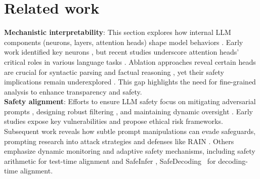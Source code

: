 \section{Related work}
\textbf{Mechanistic interpretability}: This section explores how internal LLM components (neurons, layers, attention heads) shape model behaviors \cite{geiger2021causal, stolfo2023a, gurnee2023finding}. Early work identified key neurons \cite{zou2023transparency, chen2024findingsafetyneuronslarge}, but recent studies underscore attention heads’ critical roles in various language tasks \cite{vig2019multiscalevisualizationattentiontransformer, wu2025retrieval}. Ablation approaches reveal certain heads are crucial for syntactic parsing and factual reasoning \cite{NEURIPS2019_2c601ad9, meng2023locatingeditingfactualassociations}, yet their safety implications remain underexplored \cite{gould2023successorheadsrecurringinterpretable, wang2023interpretability}. This gap highlights the need for fine-grained analysis to enhance transparency and safety.\\
\textbf{Safety alignment}: Efforts to ensure LLM safety focus on mitigating adversarial prompts \cite{xie2018mitigating}, designing robust filtering \cite{xiao2024ritfisrobustinputtesting}, and maintaining dynamic oversight \cite{kenton2024scalableoversightweakllms, wang-etal-2024-languages}. Early studies \cite{YAO2024100211} expose key vulnerabilities and propose ethical risk frameworks. Subsequent work \cite{sachdeva2025turninglogicprobing, banerjee2024unethicalinstructioncentricresponsesllms} reveals how subtle prompt manipulations can evade safeguards, prompting research into attack strategies \cite{10.5555/3692070.3694246} and defenses like RAIN \cite{li2023rainlanguagemodelsalign}. Others emphasize dynamic monitoring \cite{bhardwaj2024languagemodelshomersimpson} and adaptive safety mechanisms, including safety arithmetic \cite{hazra2024safetyarithmeticframeworktesttime} for test-time alignment and SafeInfer \cite{banerjee2024safeinfercontextadaptivedecoding}, SafeDecoding~\cite{xu2024safedecodingdefendingjailbreakattacks} for decoding-time alignment.
